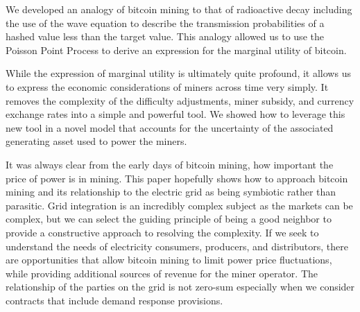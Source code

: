 \documentclass[runningheads]{llncs}
\begin{document}
We developed an analogy of bitcoin mining to that of radioactive decay including the use of the wave equation to describe the transmission probabilities of a hashed value less than the target value.
This analogy allowed us to use the Poisson Point Process to derive an expression for the marginal utility of bitcoin.

While the expression of marginal utility is ultimately quite profound, it allows us to express the economic considerations of miners across time very simply.
It removes the complexity of the difficulty adjustments, miner subsidy, and currency exchange rates into a simple and powerful tool.
We showed how to leverage this new tool in a novel model that accounts for the uncertainty of the associated generating asset used to power the miners.

It was always clear from the early days of bitcoin mining, how important the price of power is in mining.
This paper hopefully shows how to approach bitcoin mining and its relationship to the electric grid as being symbiotic rather than parasitic.
Grid integration is an incredibly complex subject as the markets can be complex, but we can select the guiding principle of being a good neighbor to provide a constructive approach to resolving the complexity.
If we seek to understand the needs of electricity consumers, producers, and distributors, there are opportunities that allow bitcoin mining to limit power price fluctuations, while providing additional sources of revenue for the miner operator.
The relationship of the parties on the grid is not zero-sum especially when we consider contracts that include demand response provisions. 


%
%


\end{document}
